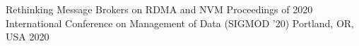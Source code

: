 

\begin{cvhonors}

  \cvhonor
    {Rethinking Message Brokers on RDMA and NVM} %
    {Proceedings of 2020 International Conference on Management of Data (SIGMOD '20)} %
    {Portland, OR, USA} %
    {2020} %
\end{cvhonors}
